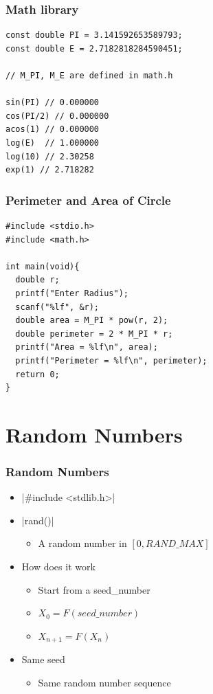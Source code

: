 \documentclass{../c-lecture}
\begin{document}
\begin{frame}[fragile]
  \frametitle{Math library}
  \begin{verbatim}
const double PI = 3.141592653589793;
const double E = 2.7182818284590451;

// M_PI, M_E are defined in math.h

sin(PI) // 0.000000
cos(PI/2) // 0.000000
acos(1) // 0.000000
log(E)  // 1.000000
log(10) // 2.30258
exp(1) // 2.718282
  \end{verbatim}
\end{frame}

\begin{frame}[fragile]
  \frametitle{Perimeter and Area of Circle}
  \begin{verbatim}
#include <stdio.h>
#include <math.h>

int main(void){
  double r;
  printf("Enter Radius");
  scanf("%lf", &r);
  double area = M_PI * pow(r, 2);
  double perimeter = 2 * M_PI * r;
  printf("Area = %lf\n", area);
  printf("Perimeter = %lf\n", perimeter);
  return 0;
}
  \end{verbatim}
\end{frame}

\section{Random Numbers}

\begin{frame}[fragile]
  \frametitle{Random Numbers}
  \begin{itemize}
    \item {}|#include <stdlib.h>|
    \item {}|rand()|
    \begin{itemize}
      \item A random number in $[0, RAND\_MAX]$
    \end{itemize}
    \item How does it work
    \begin{itemize}
      \item Start from a {\color{Orange} seed\_number}
      \item $X_0 = F(seed\_number)$
      \item $X_{n + 1} = F(X_n)$
    \end{itemize}
    \item Same seed
    \begin{itemize}
      \item Same random number sequence
    \end{itemize}
  \end{itemize}
\end{frame}
\end{document}
